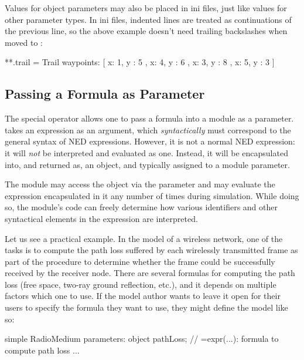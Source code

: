 Values for object parameters may also be placed in ini files, just like values
for other parameter types. In ini files, indented lines are treated as
continuations of the previous line, so the above example doesn't need trailing
backslashes when moved to :

\begin{inifile}
**.trail = Trail {
        waypoints: [
            { x: 1, y : 5 },
            { x: 4, y : 6 },
            { x: 3, y : 8 },
            { x: 5, y : 3 }
        ]
      }
\end{inifile}

\subsection{Passing a Formula as Parameter}
\label{sec:ned-lang:expr-operator}

The special operator  allows one to pass a formula into a
module as a parameter.  takes an expression as an argument,
which \textit{syntactically} must correspond to the general syntax of NED
expressions. However, it is not a normal NED expression: it will \textit{not} be
interpreted and evaluated as one. Instead, it will be encapsulated into, and
returned as, an object, and typically assigned to a module parameter.

The module may access the object via the parameter and may evaluate the
expression encapsulated in it any number of times during simulation. While doing
so, the module's code can freely determine how various identifiers and other
syntactical elements in the expression are interpreted.

Let us see a practical example. In the model of a wireless network, one of the
tasks is to compute the path loss suffered by each wirelessly transmitted frame
as part of the procedure to determine whether the frame could be successfully
received by the receiver node. There are several formulas for computing the path
loss (free space, two-ray ground reflection, etc.), and it depends on multiple
factors which one to use. If the model author wants to leave it open for their
users to specify the formula they want to use, they might define the model like
so:

\begin{ned}
simple RadioMedium {
    parameters:
        object pathLoss; // =expr(...): formula to compute path loss
    ...
}
\end{ned}

